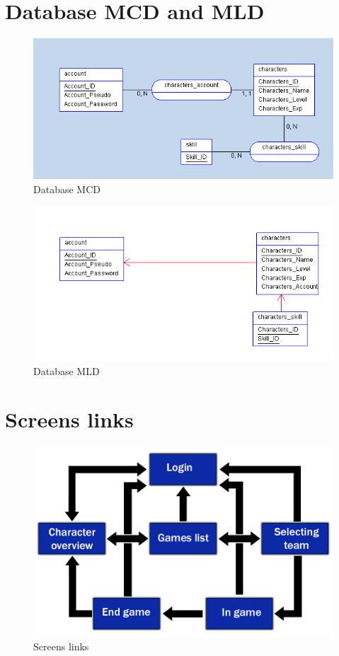 \documentclass{scrreprt}
\begin{document}
\chapter{Database MCD and MLD}
		  \begin{figure}[h]		
		  \begin{center}
		  \includegraphics[scale=0.5]{mcd.png}
		  \end{center}
		  \caption{Database MCD}
		  \end{figure}

		  \begin{figure}[h]		
		  \begin{center}
		  \includegraphics[scale=0.5]{mld.jpg}
		  \end{center}
		  \caption{Database MLD}
		  \end{figure}

\chapter{Screens links}
		  \begin{figure}[h]		
		  \begin{center}
		  \includegraphics[scale=0.4]{screen.jpg}
		  \end{center}
		  \caption{Screens links}
		  \end{figure}

					
\end{document}
